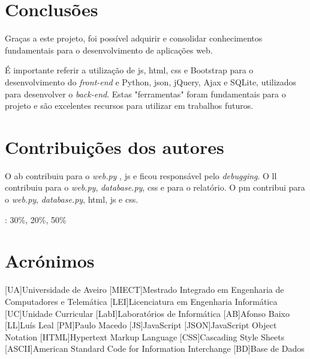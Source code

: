 \documentclass{report}
\begin{document}
\chapter{Conclusões}
\label{chap.conclusao}
Graças a este projeto, foi possível adquirir e consolidar conhecimentos fundamentais para o desenvolvimento de aplicações web. 

É importante referir a utilização de \ac{js}, \ac{html}, \ac{css} e Bootstrap para o desenvolvimento do \textit{front-end} e Python, \ac{json}, jQuery, Ajax e SQLite, utilizados para desenvolver o \textit{back-end}. Estas "ferramentas" foram fundamentais para o projeto e são excelentes recursos para utilizar em trabalhos futuros.
 

\chapter*{Contribuições dos autores}

O \ac{ab} contribuiu para o \textit{web.py} , \ac{js} e ficou responsável pelo \textit{debugging}.
O \ac{ll} contribuiu para o \textit{web.py}, \textit{database.py}, \ac{css} e para o relatório.
O \ac{pm} contribui para o \textit{web.py}, \textit{database.py}, \ac{html}, \ac{js} e \ac{css}.

\vspace{10pt}

\autores : 30\%, 20\%, 50\%\\

\chapter*{Acrónimos}
\begin{acronym}
[UA]{Universidade de Aveiro}
[MIECT]{Mestrado Integrado em Engenharia de Computadores e Telemática}
[LEI]{Licenciatura em Engenharia Informática}
[UC]{Unidade Curricular}
[LabI]{Laboratórios de Informática}
[AB]{Afonso Baixo}
[LL]{Luís Leal}
[PM]{Paulo Macedo}
[JS]{JavaScript}
[JSON]{JavaScript Object Notation}
[HTML]{Hypertext Markup Language}
[CSS]{Cascading Style Sheets}
[ASCII]{American Standard Code for Information Interchange}
[BD]{Base de Dados}
\end{acronym}




\end{document}

